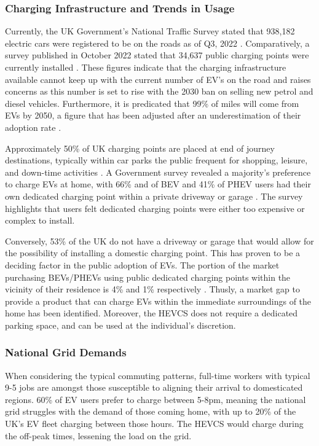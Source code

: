 \documentclass [12pt]{article}
\begin{document}
\subsubsection{Charging Infrastructure and Trends in Usage}

Currently, the UK Government’s National Traffic Survey stated that 938,182 electric cars were registered to be on the roads as of Q3, 2022 \cite{Q32022}. Comparatively, a survey published in October 2022 stated that 34,637 public charging points were currently installed \cite{chargestats}. These figures indicate that the charging infrastructure available cannot keep up with the current number of EV’s on the road and raises concerns as this number is set to rise with the 2030 ban on selling new petrol and diesel vehicles. Furthermore, it is predicated that 99\% of miles will come from EVs by 2050, a figure that has been adjusted after an underestimation of their adoption rate \cite{2050rates}. 

Approximately 50\% of UK charging points are placed at end of journey destinations, typically within car parks the public frequent for shopping, leisure, and down-time activities \cite{chargestats}. A Government survey revealed a majority's preference to charge EVs at home, with 66\% and of BEV and 41\% of PHEV users had their own dedicated charging point within a private driveway or garage \cite{homecharge}. The survey highlights that users felt dedicated charging points were either too expensive or complex to install.

Conversely, 53\% of the UK do not have a driveway or garage that would allow for the possibility of installing a domestic charging point. This has proven to be a deciding factor in the public adoption of EVs. The portion of the market purchasing BEVs/PHEVs using public dedicated charging points within the vicinity of their residence is 4\% and 1\% respectively \cite{chargestats}. Thusly, a market gap to provide a product that can charge EVs within the immediate surroundings of the home has been identified. Moreover, the HEVCS does not require a dedicated parking space, and can be used at the individual's discretion. 

\subsubsection{National Grid Demands}

When considering the typical commuting patterns, full-time workers with typical 9-5 jobs are amongst those susceptible to aligning their arrival to domesticated regions. 60\% of EV users prefer to charge between 5-8pm, meaning the national grid struggles with the demand of those coming home, with up to 20\% of the UK's EV fleet charging between those hours. The HEVCS would charge during the off-peak times, lessening the load on the grid.
\end{document}
